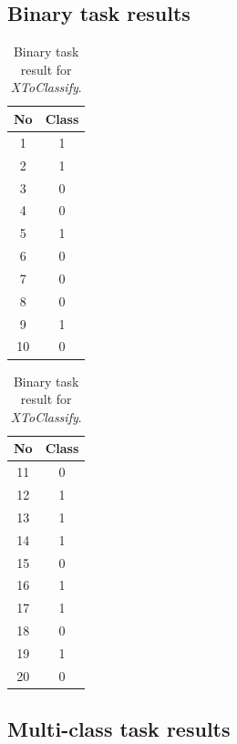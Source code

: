 \documentclass[11pt]{article}
\begin{document}
		\subsection{Binary task results}
		\begin{center}
		  	\begin{table}[h]
		  		\small

		  	\centering

			\begin{tabular}[b]{| c | c|} 
				\hline
				No & Class \\
				\hline
				1 & 1 \\ 2 & 1 \\ 3 & 0 \\ 4 & 0 \\ 5 & 1 \\ 6 & 0 \\ 7 & 0 \\ 8 & 0 \\ 9 & 1 \\ 10 & 0 \\
				\hline
			\end{tabular}
			\begin{tabular}[b]{| c | c|} 
				\hline
				No & Class \\
				\hline
				11 & 0 \\ 12 & 1 \\ 13 & 1 \\ 14 & 1 \\ 15 & 0 \\ 16 & 1 \\ 17 & 1 \\ 18 & 0 \\ 19 & 1 \\ 20 & 0 \\
				\hline
			\end{tabular}
			\caption{Binary task result for \textit{XToClassify}.}
			\label{tbl:final_binary}
			\end{table}
		\end{center}


		\subsection{Multi-class task results}
\end{document}

